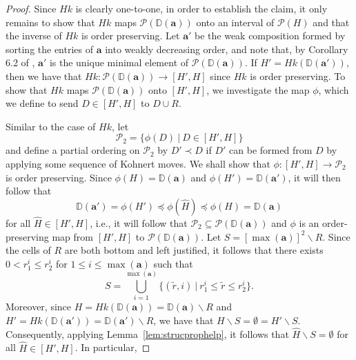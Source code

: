 \documentclass[letterpaper,10pt]{article}
\begin{document}
\begin{proof}
    Since $Hk$ is clearly one-to-one, in order to establish the claim, it only remains to show that $Hk$ maps $\mathcal{P}(\mathbb{D}(\mathbf{a}))$ onto an interval of $\mathcal{P}(H)$ and that the inverse of $Hk$ is order preserving. Let $\mathbf{a}'$ be the weak composition formed by sorting the entries of $\mathbf{a}$ into weakly decreasing order, and note that, by Corollary 6.2 of \textbf{\cite{KPoset1}}, $\mathbf{a}'$ is the unique minimal element of $\mathcal{P}(\mathbb{D}(\mathbf{a}))$. If $H'=Hk(\mathbb{D}(\mathbf{a}'))$, then we have that $Hk:\mathcal{P}(\mathbb{D}(\mathbf{a}))\to [H',H]$ since $Hk$ is order preserving. To show that $Hk$ maps $\mathcal{P}(\mathbb{D}(\mathbf{a}))$ onto $[H',H]$, we investigate the map $\phi$, which we define to send $D\in [H',H]$ to $D\cup R$. 

    Similar to the case of $Hk$, let $$\mathcal{P}_2=\{\phi(D)~|~D\in[H',H]\}$$ and define a partial ordering on $\mathcal{P}_2$ by $D'\prec D$ if $D'$ can be formed from $D$ by applying some sequence of Kohnert moves. We shall show that $\phi:[H',H]\to \mathcal{P}_2$ is order preserving. Since $\phi(H)=\mathbb{D}(\mathbf{a})$ and $\phi(H')=\mathbb{D}(\mathbf{a}')$, it will then follow that $$\mathbb{D}(\mathbf{a}')=\phi(H')\preceq \phi(\widehat{H})\preceq \phi(H)=\mathbb{D}(\mathbf{a})$$ for all $\widehat{H}\in [H',H]$, i.e., it will follow that $\mathcal{P}_2\subseteq \mathcal{P}(\mathbb{D}(\mathbf{a}))$ and $\phi$ is an order-preserving map from $[H',H]$ to $\mathcal{P}(\mathbb{D}(\mathbf{a}))$. Let $S=[\max(\mathbf{a})]^2\backslash R$. Since the cells of $R$ are both bottom and left justified, it follows that there exists $0<r^i_1\le r^i_2$ for $1\le i\le \max(\mathbf{a})$ such that $$S=\bigcup_{i=1}^{\max(\mathbf{a})}\{(\tilde{r},i)~|~r^i_1\le \tilde{r}\le r^i_2\}.$$ Moreover, since $H=Hk(\mathbb{D}(\mathbf{a}))=\mathbb{D}(\mathbf{a})\backslash R$ and $H'=Hk(\mathbb{D}(\mathbf{a}'))=\mathbb{D}(\mathbf{a}')\backslash R$, we have that $H\backslash S=\emptyset=H'\backslash S$. Consequently, applying Lemma~\ref{lem:strucprophelp}, it follows that $\widehat{H}\backslash S=\emptyset$ for all $\widehat{H}\in [H',H]$. In particular, 

\end{proof}
\end{document}
